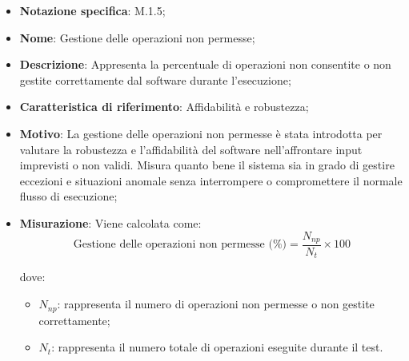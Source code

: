 \begin{itemize}
    \item \textbf{Notazione specifica}: M.1.5;
    \item \textbf{Nome}:  Gestione delle operazioni non permesse;
    \item \textbf{Descrizione}: Appresenta la percentuale di operazioni non consentite o non gestite correttamente dal software durante l'esecuzione;
    \item \textbf{Caratteristica di riferimento}: Affidabilità e robustezza;
    \item \textbf{Motivo}: La gestione delle operazioni non permesse è stata introdotta per valutare la robustezza e l'affidabilità del software nell'affrontare input imprevisti o non validi. Misura quanto bene il sistema sia in grado di gestire eccezioni e situazioni anomale senza interrompere o compromettere il normale flusso di esecuzione;
    \item \textbf{Misurazione}: Viene calcolata come:
    \[
    \text{Gestione delle operazioni non permesse (\%)} = \frac{N_{np}}{N_{t}} \times 100
    \]
    
    dove:
    \begin{itemize}
        \item $N_{np}$: rappresenta il numero di operazioni non permesse o non gestite correttamente;
        \item $N_{t}$: rappresenta il numero totale di operazioni eseguite durante il test.
    \end{itemize}
\end{itemize}